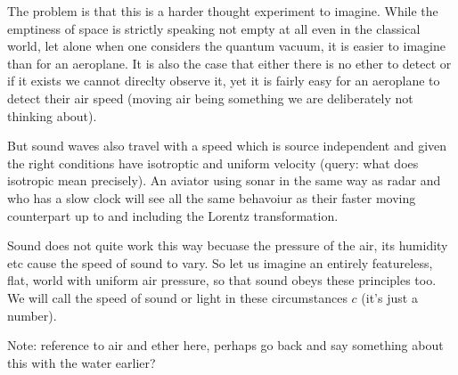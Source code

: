 \documentclass{report}
\begin{document}
The problem is that this is a harder thought experiment to imagine. While the emptiness of space is strictly speaking not empty at all even in the classical world, let alone when one considers the quantum vacuum, it is easier to imagine than for an aeroplane. It is also the case that either there is no ether to detect or if it exists we cannot direclty observe it, yet it is fairly easy for an aeroplane to detect their air speed (moving air being something we are deliberately not thinking about).

But sound waves also travel with a speed which is source independent and given the right conditions have isotroptic and uniform velocity (query: what does isotropic mean precisely). An aviator using sonar in the same way as radar and who has a slow clock will see all the same behavoiur as their faster moving counterpart up to and including the Lorentz transformation. 

Sound does not quite work this way becuase the pressure of the air, its humidity etc cause the speed of sound to vary. So let us imagine an entirely featureless, flat, world with uniform air pressure, so that sound obeys these principles too. We will call the speed of sound or light in these circumstances $c$ (it's just a number).

Note: reference to air and ether here, perhaps go back and say something about this with the water earlier?
\end{document}
